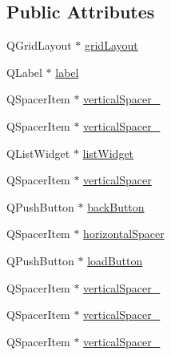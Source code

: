 \subsection*{Public Attributes}
\begin{DoxyCompactItemize}
\item 
Q\-Grid\-Layout $\ast$ \hyperlink{classUi__SpielLaden_ad098c5fa7cc53100fb8a7b36b2652e42}{grid\-Layout}
\item 
Q\-Label $\ast$ \hyperlink{classUi__SpielLaden_a21871b9f6c93c357a57aea0d2c2bac9b}{label}
\item 
Q\-Spacer\-Item $\ast$ \hyperlink{classUi__SpielLaden_a3400e07c7ff6b79b40f7c9e07061e9e4}{vertical\-Spacer\-\_}
\item 
Q\-Spacer\-Item $\ast$ \hyperlink{classUi__SpielLaden_ae78f02ff321a04a672d848e86adc2d11}{vertical\-Spacer\-\_}
\item 
Q\-List\-Widget $\ast$ \hyperlink{classUi__SpielLaden_a54a93deade0f70fd402035593aa2dd76}{list\-Widget}
\item 
Q\-Spacer\-Item $\ast$ \hyperlink{classUi__SpielLaden_a6d0ae57a2471e4691f4f9824c28ee8a1}{vertical\-Spacer}
\item 
Q\-Push\-Button $\ast$ \hyperlink{classUi__SpielLaden_a1037033e2de6d16b84dbd67f5a004f6b}{back\-Button}
\item 
Q\-Spacer\-Item $\ast$ \hyperlink{classUi__SpielLaden_a2ede480b208ea6777ea78d4951f96de6}{horizontal\-Spacer}
\item 
Q\-Push\-Button $\ast$ \hyperlink{classUi__SpielLaden_a365b44595b07721d3aadb189a29fb88e}{load\-Button}
\item 
Q\-Spacer\-Item $\ast$ \hyperlink{classUi__SpielLaden_a14b1f6e8195a774ca6d44fefdddb2f30}{vertical\-Spacer\-\_}
\item 
Q\-Spacer\-Item $\ast$ \hyperlink{classUi__SpielLaden_a5fbc0920408059f1d14de15ace1fe5bf}{vertical\-Spacer\-\_}
\item 
Q\-Spacer\-Item $\ast$ \hyperlink{classUi__SpielLaden_a9db7e5483d2da926204b66a7313bf423}{vertical\-Spacer\-\_}
\end{DoxyCompactItemize}


